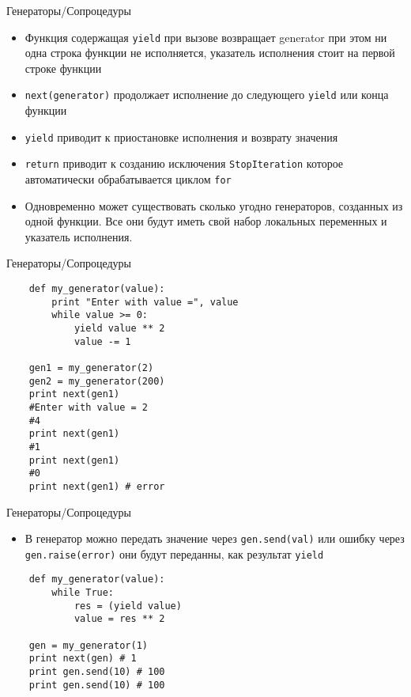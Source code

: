 \documentclass{article}
\begin{document}
\begin{center} Генераторы/Сопроцедуры \end{center}
\begin{itemize}
    \item Функция содержащая \lstinline!yield! при вызове возвращает generator
        при этом ни одна строка функции не исполняется, указатель исполнения стоит 
        на первой строке функции
    \item \lstinline!next(generator)! продолжает исполнение до следующего 
        \lstinline!yield! или конца функции
    \item \lstinline!yield! приводит к приостановке исполнения и возврату значения
    \item \lstinline!return! приводит к созданию исключения \lstinline!StopIteration!
        которое автоматически обрабатывается циклом \lstinline!for!
    \item Одновременно может существовать сколько угодно генераторов, созданных из одной функции.
        Все они будут иметь свой набор локальных переменных и указатель исполнения.
\end{itemize}
\newpage

\begin{center} Генераторы/Сопроцедуры \end{center}
\vspace{15pt}
\begin{lstlisting}
    def my_generator(value):
        print "Enter with value =", value
        while value >= 0:
            yield value ** 2
            value -= 1

    gen1 = my_generator(2)
    gen2 = my_generator(200)
    print next(gen1) 
    #Enter with value = 2
    #4
    print next(gen1)
    #1
    print next(gen1)
    #0
    print next(gen1) # error
\end{lstlisting}
\newpage

\begin{center} Генераторы/Сопроцедуры \end{center}
\begin{itemize}
    \item В генератор можно передать значение через \lstinline!gen.send(val)!
        или ошибку через \lstinline!gen.raise(error)! они будут переданны, как 
        результат \lstinline!yield!
\end{itemize}
\vspace{15pt}
\begin{lstlisting}
    def my_generator(value):
        while True:
            res = (yield value)
            value = res ** 2

    gen = my_generator(1)
    print next(gen) # 1
    print gen.send(10) # 100
    print gen.send(10) # 100
\end{lstlisting}
\newpage
\end{document}
